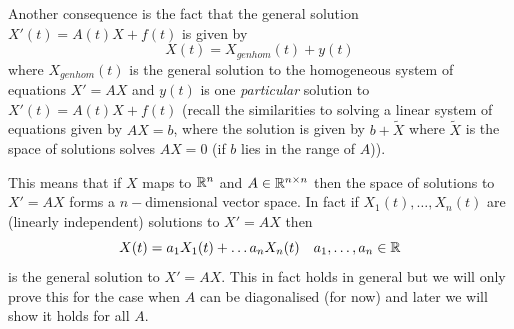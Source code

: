 Another consequence is the fact that the general solution $X'(t) = A(t)X + f(t)$ is given by
$$ X(t) = X_{genhom}(t) + y(t) $$
where $X_{genhom}(t)$ is the general solution to the homogeneous system of equations $X' = AX$ and $y(t)$ is one \textit{particular} solution to $X'(t) = A(t)X + f(t)$ (recall the similarities to solving a linear system of equations given by $AX = b$, where the solution is given by $b + \tilde{X}$ where $\tilde{X}$ is the space of solutions solves $AX = 0$ (if $b$ lies in the range of $A$)).

This means that if $X$ maps to $\mathbb{R}^n$ and $A \in \mathbb{R}^{n \times n}$ then the space of solutions to $X' = AX$ forms a $n-$dimensional vector space. In fact if $X_1(t), \dots, X_n(t)$ are (linearly independent) solutions to $X' = AX$ then 
$$ X(t) = a_1 X_1(t) + \dots a_n X_n(t) \quad a_1, \dots, a_n \in \mathbb{R} $$
is the general solution to $X' = AX$. This in fact holds in general but we will only prove this for the case when $A$ can be diagonalised (for now) and later we will show it holds for all $A$.

